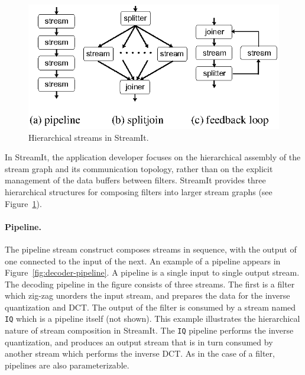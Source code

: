 \begin{figure}[t]
\begin{center}
 \includegraphics[scale=1, angle=0]{./constructs-eg.eps}
 \caption{Hierarchical streams in StreamIt.}
 \label{fig:containers}
\end{center}
\end{figure}

In StreamIt, the application developer focuses on the hierarchical
assembly of the stream graph and its communication topology, rather
than on the  explicit management of the data buffers between filters.
StreamIt provides three hierarchical structures for composing filters
into larger stream graphs (see Figure~\ref{fig:containers}).

\paragraph{Pipeline.}
The pipeline stream construct composes streams in sequence, with
the output of one connected to the input of the next.  An example of a
pipeline appears in Figure~\ref{fig:decoder-pipeline}. A pipeline is a
single input to single output stream. The decoding pipeline in the
figure consists of three streams. The first is a filter which zig-zag
unorders the input stream, and prepares the data for the inverse
quantization and DCT. The output of the filter is consumed by a stream
named {\tt IQ} which is a pipeline itself (not shown). This example
illustrates the hierarchical nature of stream composition in
StreamIt. The {\tt IQ} pipeline performs the inverse quantization, and
produces an output stream that is in turn consumed by another stream
which performs the inverse DCT. As in the case of a filter, pipelines
are also parameterizable.

